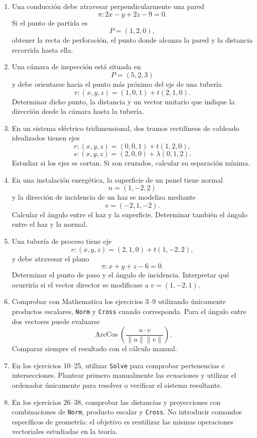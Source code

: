 \begin{enumerate}
\item Una conducción debe atravesar perpendicularmente una pared
\[
\pi:2x-y+2z-9=0.
\]
Si el punto de partida es
\[
P=(1,2,0),
\]
obtener la recta de perforación, el punto donde alcanza la pared y la distancia recorrida hasta ella.

\item Una cámara de inspección está situada en
\[
P=(5,2,3)
\]
y debe orientarse hacia el punto más próximo del eje de una tubería
\[
r:(x,y,z)=(1,0,1)+t(2,1,0).
\]
Determinar dicho punto, la distancia y un vector unitario que indique la dirección desde la cámara hasta la tubería.

\item En un sistema eléctrico tridimensional, dos tramos rectilíneos de cableado idealizados tienen ejes
\[
r:(x,y,z)=(0,0,1)+t(1,2,0),
\]
\[
s:(x,y,z)=(2,0,0)+\lambda(0,1,2).
\]
Estudiar si los ejes se cortan. Si son cruzados, calcular su separación mínima.

\item En una instalación energética, la superficie de un panel tiene normal
\[
n=(1,-2,2)
\]
y la dirección de incidencia de un haz se modeliza mediante
\[
v=(-2,1,-2).
\]
Calcular el ángulo entre el haz y la superficie. Determinar también el ángulo entre el haz y la normal.

\item Una tubería de proceso tiene eje
\[
r:(x,y,z)=(2,1,0)+t(1,-2,2),
\]
y debe atravesar el plano
\[
\pi:x+y+z-6=0.
\]
Determinar el punto de paso y el ángulo de incidencia. Interpretar qué ocurriría si el vector director se modificase a $v=(1,-2,1)$.

\item \M Comprobar con Mathematica los ejercicios 3--9 utilizando únicamente productos escalares, \texttt{Norm} y \texttt{Cross} cuando corresponda. Para el ángulo entre dos vectores puede evaluarse
\[
\operatorname{ArcCos}\left(\frac{u\cdot v}{\|u\|\|v\|}\right).
\]
Comparar siempre el resultado con el cálculo manual.

\item \M En los ejercicios 10--25, utilizar \texttt{Solve} para comprobar pertenencias e intersecciones. Plantear primero manualmente las ecuaciones y utilizar el ordenador únicamente para resolver o verificar el sistema resultante.

\item \M En los ejercicios 26--38, comprobar las distancias y proyecciones con combinaciones de \texttt{Norm}, producto escalar y \texttt{Cross}. No introducir comandos específicos de geometría: el objetivo es reutilizar las mismas operaciones vectoriales estudiadas en la teoría.


\end{enumerate}
